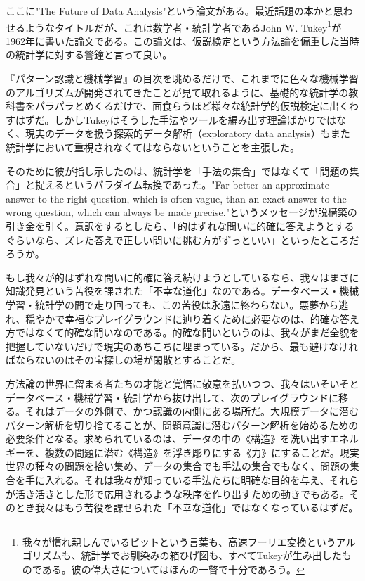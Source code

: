 ここに"The Future of Data Analysis"という論文がある。最近話題の本かと思わせるようなタイトルだが、これは数学者・統計学者であるJohn W. Tukey\footnote{我々が慣れ親しんでいるビットという言葉も、高速フーリエ変換というアルゴリズムも、統計学でお馴染みの箱ひげ図も、すべてTukeyが生み出したものである。彼の偉大さについてはほんの一瞥で十分であろう。}が1962年に書いた論文である。この論文は、仮説検定という方法論を偏重した当時の統計学に対する警鐘と言って良い。

『パターン認識と機械学習』の目次を眺めるだけで、これまでに色々な機械学習のアルゴリズムが開発されてきたことが見て取れるように、基礎的な統計学の教科書をパラパラとめくるだけで、面食らうほど様々な統計学的仮説検定に出くわすはずだ。しかしTukeyはそうした手法やツールを編み出す理論ばかりではなく、現実のデータを扱う探索的データ解析（exploratory data analysis）もまた統計学において重視されなくてはならないということを主張した。

そのために彼が指し示したのは、統計学を「手法の集合」ではなくて「問題の集合」と捉えるというパラダイム転換であった。"Far better an approximate answer to the right question, which is often vague, than an exact answer to the wrong question, which can always be made precise."というメッセージが脱構築の引き金を引く。意訳をするとしたら、「的はずれな問いに的確に答えようとするぐらいなら、ズレた答えで正しい問いに挑む方がずっといい」といったところだろうか。

もし我々が的はずれな問いに的確に答え続けようとしているなら、我々はまさに知識発見という苦役を課された「不幸な道化」なのである。データベース・機械学習・統計学の間で走り回っても、この苦役は永遠に終わらない。悪夢から逃れ、穏やかで幸福なプレイグラウンドに辿り着くために必要なのは、的確な答え方ではなくて的確な問いなのである。的確な問いというのは、我々がまだ全貌を把握していないだけで現実のあちこちに埋まっている。だから、最も避けなければならないのはその宝探しの場が閑散とすることだ。

方法論の世界に留まる者たちの才能と覚悟に敬意を払いつつ、我々はいそいそとデータベース・機械学習・統計学から抜け出して、次のプレイグラウンドに移る。それはデータの外側で、かつ認識の内側にある場所だ。大規模データに潜むパターン解析を切り捨てることが、問題意識に潜むパターン解析を始めるための必要条件となる。求められているのは、データの中の《構造》を洗い出すエネルギーを、複数の問題に潜む《構造》を浮き彫りにする《力》にすることだ。現実世界の種々の問題を拾い集め、データの集合でも手法の集合でもなく、問題の集合を手に入れる。それは我々が知っている手法たちに明確な目的を与え、それらが活き活きとした形で応用されるような秩序を作り出すための動きでもある。そのとき我々はもう苦役を課せられた「不幸な道化」ではなくなっているはずだ。

